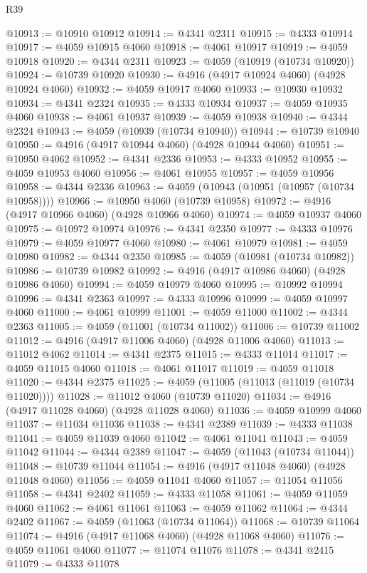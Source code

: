 \begin{lexlean}{R39}
\begin{coremodule}
@10913 := @10910 @10912
@10914 := @4341 @2311
@10915 := @4333 @10914
@10917 := @4059 @10915 @4060
@10918 := @4061 @10917
@10919 := @4059 @10918
@10920 := @4344 @2311
@10923 := @4059 (@10919 (@10734 @10920))
@10924 := @10739 @10920
@10930 := @4916 (@4917 @10924 @4060) (@4928 @10924 @4060)
@10932 := @4059 @10917 @4060
@10933 := @10930 @10932
@10934 := @4341 @2324
@10935 := @4333 @10934
@10937 := @4059 @10935 @4060
@10938 := @4061 @10937
@10939 := @4059 @10938
@10940 := @4344 @2324
@10943 := @4059 (@10939 (@10734 @10940))
@10944 := @10739 @10940
@10950 := @4916 (@4917 @10944 @4060) (@4928 @10944 @4060)
@10951 := @10950 @4062
@10952 := @4341 @2336
@10953 := @4333 @10952
@10955 := @4059 @10953 @4060
@10956 := @4061 @10955
@10957 := @4059 @10956
@10958 := @4344 @2336
@10963 := @4059 (@10943 (@10951 (@10957 (@10734 @10958))))
@10966 := @10950 @4060 (@10739 @10958)
@10972 := @4916 (@4917 @10966 @4060) (@4928 @10966 @4060)
@10974 := @4059 @10937 @4060
@10975 := @10972 @10974
@10976 := @4341 @2350
@10977 := @4333 @10976
@10979 := @4059 @10977 @4060
@10980 := @4061 @10979
@10981 := @4059 @10980
@10982 := @4344 @2350
@10985 := @4059 (@10981 (@10734 @10982))
@10986 := @10739 @10982
@10992 := @4916 (@4917 @10986 @4060) (@4928 @10986 @4060)
@10994 := @4059 @10979 @4060
@10995 := @10992 @10994
@10996 := @4341 @2363
@10997 := @4333 @10996
@10999 := @4059 @10997 @4060
@11000 := @4061 @10999
@11001 := @4059 @11000
@11002 := @4344 @2363
@11005 := @4059 (@11001 (@10734 @11002))
@11006 := @10739 @11002
@11012 := @4916 (@4917 @11006 @4060) (@4928 @11006 @4060)
@11013 := @11012 @4062
@11014 := @4341 @2375
@11015 := @4333 @11014
@11017 := @4059 @11015 @4060
@11018 := @4061 @11017
@11019 := @4059 @11018
@11020 := @4344 @2375
@11025 := @4059 (@11005 (@11013 (@11019 (@10734 @11020))))
@11028 := @11012 @4060 (@10739 @11020)
@11034 := @4916 (@4917 @11028 @4060) (@4928 @11028 @4060)
@11036 := @4059 @10999 @4060
@11037 := @11034 @11036
@11038 := @4341 @2389
@11039 := @4333 @11038
@11041 := @4059 @11039 @4060
@11042 := @4061 @11041
@11043 := @4059 @11042
@11044 := @4344 @2389
@11047 := @4059 (@11043 (@10734 @11044))
@11048 := @10739 @11044
@11054 := @4916 (@4917 @11048 @4060) (@4928 @11048 @4060)
@11056 := @4059 @11041 @4060
@11057 := @11054 @11056
@11058 := @4341 @2402
@11059 := @4333 @11058
@11061 := @4059 @11059 @4060
@11062 := @4061 @11061
@11063 := @4059 @11062
@11064 := @4344 @2402
@11067 := @4059 (@11063 (@10734 @11064))
@11068 := @10739 @11064
@11074 := @4916 (@4917 @11068 @4060) (@4928 @11068 @4060)
@11076 := @4059 @11061 @4060
@11077 := @11074 @11076
@11078 := @4341 @2415
@11079 := @4333 @11078

\end{coremodule}
\end{lexlean}
